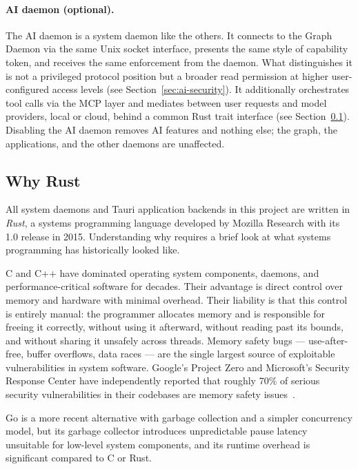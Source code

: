 \paragraph{AI daemon (optional).}
The AI daemon is a system daemon like the others. It connects to the Graph
Daemon via the same Unix socket interface, presents the same style of capability
token, and receives the same enforcement from the daemon. What distinguishes it
is not a privileged protocol position but a broader read permission at higher
user-configured access levels (see Section~\ref{sec:ai-security}). It
additionally orchestrates tool calls via the MCP layer and mediates between user
requests and model providers, local or cloud, behind a common Rust trait
interface (see Section~\ref{sec:rust-intro}). Disabling the AI daemon removes
AI features and nothing else; the graph, the applications, and the other daemons
are unaffected.

\subsection{Why Rust}
\label{sec:rust-intro}

All system daemons and Tauri application backends in this project are written in
\emph{Rust}, a systems programming language developed by Mozilla Research with
its 1.0 release in 2015. Understanding why requires a brief look at what systems
programming has historically looked like.

C and C++ have dominated operating system components, daemons, and
performance-critical software for decades. Their advantage is direct control
over memory and hardware with minimal overhead. Their liability is that this
control is entirely manual: the programmer allocates memory and is responsible
for freeing it correctly, without using it afterward, without reading past its
bounds, and without sharing it unsafely across threads. Memory safety bugs ---
use-after-free, buffer overflows, data races --- are the single largest source
of exploitable vulnerabilities in system software. Google's Project Zero and
Microsoft's Security Response Center have independently reported that roughly
70\% of serious security vulnerabilities in their codebases are memory safety
issues~\cite{msrc2019memory}.

Go is a more recent alternative with garbage collection and a simpler
concurrency model, but its garbage collector introduces unpredictable pause
latency unsuitable for low-level system components, and its runtime overhead is
significant compared to C or Rust.

